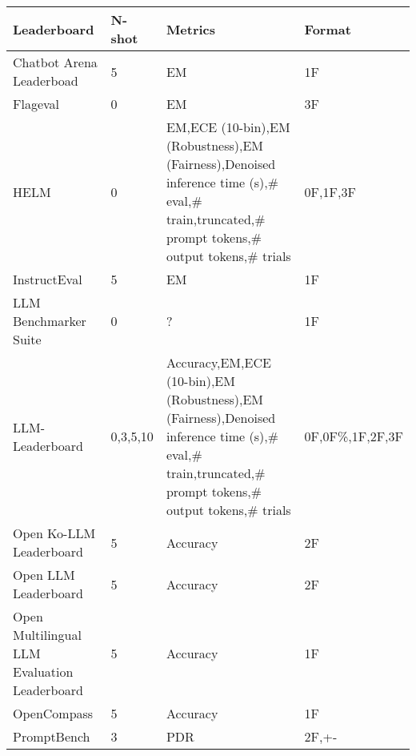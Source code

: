 \begin{tabular}{llll}
\toprule
Leaderboard & N-shot & Metrics & Format \\
\midrule
Chatbot Arena Leaderboad & 5 & EM & 1F \\
Flageval & 0 & EM & 3F \\
HELM & 0 & EM,ECE (10-bin),EM (Robustness),EM (Fairness),Denoised inference time (s),\# eval,\# train,truncated,\# prompt tokens,\# output tokens,\# trials & 0F,1F,3F \\
InstructEval & 5 & EM & 1F \\
LLM Benchmarker Suite & 0 & ? & 1F \\
LLM-Leaderboard & 0,3,5,10 & Accuracy,EM,ECE (10-bin),EM (Robustness),EM (Fairness),Denoised inference time (s),\# eval,\# train,truncated,\# prompt tokens,\# output tokens,\# trials & 0F,0F\%,1F,2F,3F \\
Open Ko-LLM Leaderboard & 5 & Accuracy & 2F \\
Open LLM Leaderboard & 5 & Accuracy & 2F \\
Open Multilingual LLM Evaluation Leaderboard & 5 & Accuracy & 1F \\
OpenCompass & 5 & Accuracy & 1F \\
PromptBench & 3 & PDR & 2F,+- \\
\bottomrule
\end{tabular}
